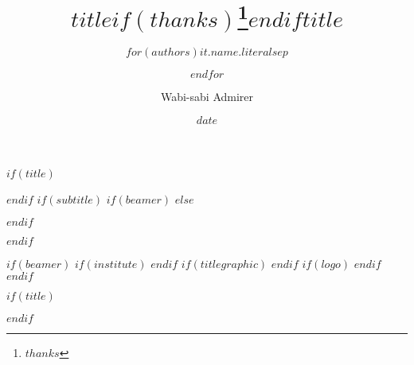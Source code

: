 
$if(title)$
\title{$title$$if(thanks)$\thanks{$thanks$}$endif$}
$endif$
$if(subtitle)$
$if(beamer)$
$else$
\usepackage{etoolbox}
\makeatletter
\providecommand{\subtitle}[1]{%
  \apptocmd{\@title}{\par {\large #1 \par}}{}{}
}
\makeatother
$endif$
\subtitle{$subtitle$}
$endif$
\author{$for(authors)$$it.name.literal$$sep$ \and $endfor$}
\date{$date$}
$if(beamer)$
$if(institute)$
$endif$
$if(titlegraphic)$
$endif$
$if(logo)$
$endif$
$endif$




$if(title)$
\title{$title$}
$endif$

\author{Wabi-sabi Admirer}




%
%


